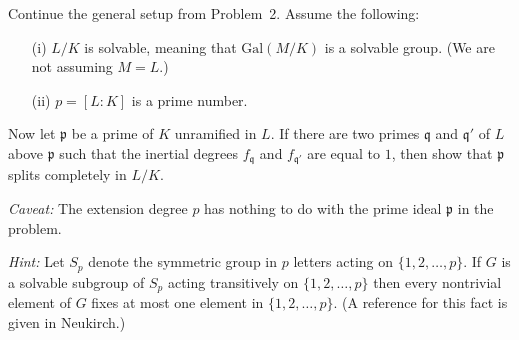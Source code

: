 \documentclass[12pt]{article}  %
\begin{document}
\begin{problem}
Continue the general setup from Problem~2. Assume the following:
\begin{enumerate}
    \item[(i)] $L/K$ is solvable, meaning that $\mathrm{Gal}(M/K)$ is a solvable group. (We are not assuming $M=L$.)
    \item[(ii)] $p = [L:K]$ is a prime number.
\end{enumerate}

Now let $\mathfrak{p}$ be a prime of $K$ unramified in $L$. If there are two primes $\mathfrak{q}$ and $\mathfrak{q}'$ of $L$ above $\mathfrak{p}$ such that the inertial degrees $f_{\mathfrak{q}}$ and $f_{\mathfrak{q}'}$ are equal to $1$, then show that $\mathfrak{p}$ splits completely in $L/K$.

\textit{Caveat:} The extension degree $p$ has nothing to do with the prime ideal $\mathfrak{p}$ in the problem.

\textit{Hint:} Let $S_p$ denote the symmetric group in $p$ letters acting on $\{1,2,\dots,p\}$. If $G$ is a solvable subgroup of $S_p$ acting transitively on $\{1,2,\dots,p\}$ then every nontrivial element of $G$ fixes at most one element in $\{1,2,\dots,p\}$. (A reference for this fact is given in Neukirch.)
\end{problem}

\begin{solution}
\end{solution}
\end{document}
